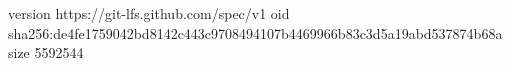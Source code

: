 version https://git-lfs.github.com/spec/v1
oid sha256:de4fe1759042bd8142c443c9708494107b4469966b83c3d5a19abd537874b68a
size 5592544
